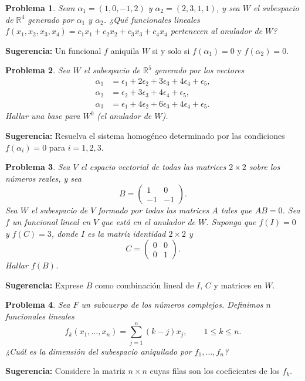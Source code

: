 \documentclass[12pt,a4paper]{article}
\newtheorem{problem}{Problema}
\newenvironment{suggestion}{\par\noindent\textbf{Sugerencia: }}{}
\begin{document}
\begin{problem}
Sean $\alpha_1=(1,0,-1,2)$ y $\alpha_2=(2,3,1,1)$, y sea $W$ el subespacio de $\mathbb{R}^4$ generado por $\alpha_1$ y $\alpha_2$. ¿Qué funcionales lineales $f(x_1,x_2,x_3,x_4)=c_1x_1+c_2x_2+c_3x_3+c_4x_4$ pertenecen al anulador de $W$?
\end{problem}
\begin{suggestion}
Un funcional $f$ aniquila $W$ si y solo si $f(\alpha_1)=0$ y $f(\alpha_2)=0$.
\end{suggestion}

\begin{problem}
Sea $W$ el subespacio de $\mathbb{R}^5$ generado por los vectores
\begin{align*}
\alpha_1 &= \epsilon_1+2\epsilon_2+3\epsilon_3+4\epsilon_4+\epsilon_5, \\
\alpha_2 &= \epsilon_2+3\epsilon_3+4\epsilon_4+\epsilon_5, \\
\alpha_3 &= \epsilon_1+4\epsilon_2+6\epsilon_3+4\epsilon_4+\epsilon_5.
\end{align*}
Hallar una base para $W^0$ (el anulador de $W$).
\end{problem}
\begin{suggestion}
Resuelva el sistema homogéneo determinado por las condiciones $f(\alpha_i)=0$ para $i=1,2,3$.
\end{suggestion}

\begin{problem}
Sea $V$ el espacio vectorial de todas las matrices $2\times 2$ sobre los números reales, y sea
\[
B=\begin{pmatrix}1&0\\-1&-1\end{pmatrix}.
\]
Sea $W$ el subespacio de $V$ formado por todas las matrices $A$ tales que $AB=0$. Sea $f$ un funcional lineal en $V$ que está en el anulador de $W$. Suponga que $f(I)=0$ y $f(C)=3$, donde $I$ es la matriz identidad $2\times 2$ y
\[
C=\begin{pmatrix}0&0\\0&1\end{pmatrix}.
\]
Hallar $f(B)$.
\end{problem}
\begin{suggestion}
Exprese $B$ como combinación lineal de $I$, $C$ y matrices en $W$.
\end{suggestion}

\begin{problem}
Sea $F$ un subcuerpo de los números complejos. Definimos $n$ funcionales lineales
\[
f_k(x_1,\dots,x_n)=\sum_{j=1}^n (k-j)x_j,\qquad 1\leq k\leq n.
\]
¿Cuál es la dimensión del subespacio aniquilado por $f_1,\dots,f_n$?
\end{problem}
\begin{suggestion}
Considere la matriz $n\times n$ cuyas filas son los coeficientes de los $f_k$.
\end{suggestion}
\end{document}
